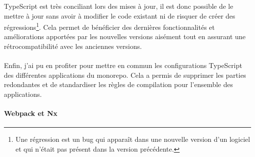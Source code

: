 \documentclass[12pt, a4paper]{report}
\begin{document}
	\noindent
	TypeScript est très conciliant lors des mises à jour, il est donc possible de le mettre à jour sans avoir à modifier le code existant ni de risquer de créer des régressions\footnote{Une régression est un bug qui apparaît dans une nouvelle version d'un logiciel et qui n'était pas présent dans la version précédente.}. Cela permet de bénéficier des dernières fonctionnalités et améliorations apportées par les nouvelles versions aisément tout en assurant une rétrocompatibilité avec les anciennes versions.
	\\\\
	Enfin, j'ai pu en profiter pour mettre en commun les configurations TypeScript des différentes applications du monorepo. Cela a permis de supprimer les parties redondantes et de standardiser les règles de compilation pour l'ensemble des applications.
	
	\paragraph{Webpack et Nx}
\end{document}
